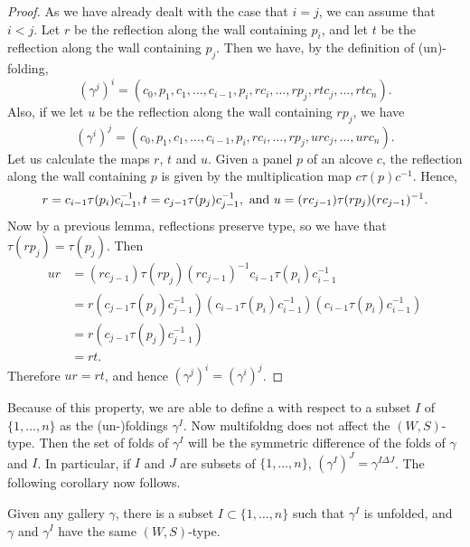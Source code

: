 \documentclass[11pt]{article}
\begin{document}
\begin{proof}
    As we have already dealt with the case that $i=j$, we can assume that $i<j$. Let $r$ be the reflection along the wall containing $p_i$, and let $t$ be the reflection along the wall containing $p_j$. Then we have, by the definition of (un)-folding,
    \[(\gamma^j)^i=(c_0,p_1,c_1,\hdots,c_{i-1},p_i,rc_i,\hdots ,rp_j,rtc_j,\hdots ,rtc_n).\]
    Also, if we let $u$ be the reflection along the wall containing $rp_j$, we have
    \[(\gamma^i)^j=(c_0,p_1,c_1,\hdots ,c_{i-1},p_i,rc_i,\hdots ,rp_j,urc_j,\hdots ,urc_n).\]
    Let us calculate the maps $r$, $t$ and $u$. Given a panel $p$ of an alcove $c$, the reflection along the wall containing $p$ is given by the multiplication map $c\tau(p)c^{-1}$. Hence,
    \[r=c_{i-1}\tau(p_i)c_{i-1}^{-1}, t=c_{j-1}\tau(p_j)c_{j-1}^{-1}, \textnormal{ and } u=(rc_{j-1})\tau(rp_j)(rc_{j-1})^{-1}.\]
    Now by a previous lemma, reflections preserve type, so we have that $\tau(rp_j)=\tau(p_j)$. Then
    \[\begin{aligned}
        ur & =(rc_{j-1})\tau(rp_j)(rc_{j-1})^{-1}c_{i-1}\tau(p_i)c_{i-1}^{-1}\\
           & =r(c_{j-1}\tau(p_j)c_{j-1}^{-1})(c_{i-1}\tau(p_i)c_{i-1}^{-1})(c_{i-1}\tau(p_i)c_{i-1}^{-1})\\
           & = r(c_{j-1}\tau(p_j)c_{j-1}^{-1})\\
           & =rt.
    \end{aligned}\]
    Therefore $ur=rt$, and hence $(\gamma^j)^i=(\gamma^i)^j$.
\end{proof}

Because of this property, we are able to define a  with respect to a subset $I$ of $\{1,\hdots ,n\}$ as the (un-)foldings $\gamma^I$. Now multifoldng does not affect the $(W,S)$-type. Then the set of folds of $\gamma^I$ will be the symmetric difference of the folds of $\gamma$ and $I$. In particular, if $I$ and $J$ are subsets of $\{1,\hdots ,n\}$, $(\gamma^I)^J=\gamma^{I\Delta J}$. The following corollary now follows.

\begin{corollary}
    Given any gallery $\gamma$, there is a subset $I\subset \{1,\hdots ,n\}$ such that $\gamma^I$ is unfolded, and $\gamma$ and $\gamma^I$ have the same $(W,S)$-type.
\end{corollary}
\end{document}
